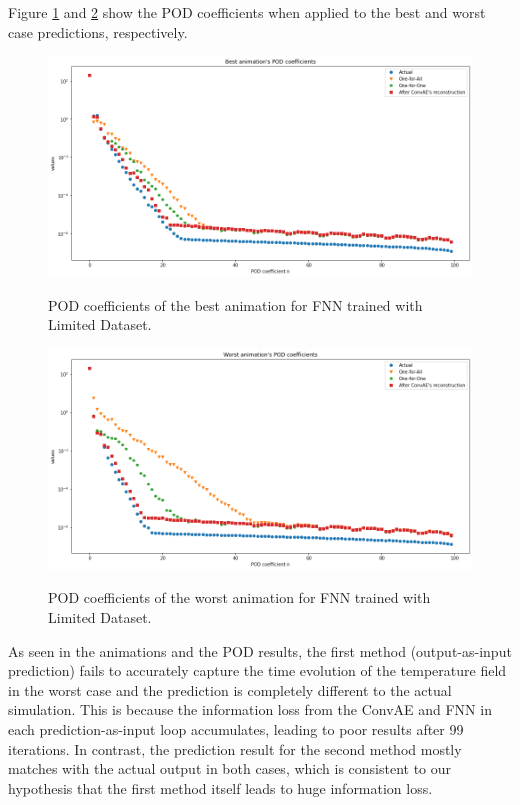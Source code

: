 Figure \ref{figure:FNN_limited_best_POD} and \ref{figure:FNN_limited_worst_POD} show the POD coefficients when applied to the best and worst case predictions, respectively.

\begin{figure}[H]
    \centering
    \caption{POD coefficients of the best animation for FNN trained with Limited Dataset.}
    \includegraphics[scale=0.4]{figures/mantle_convection_images/limited_dataset/FNN_Best_POD.png}
    \label{figure:FNN_limited_best_POD}
\end{figure}

\begin{figure}[H]
    \centering
    \caption{POD coefficients of the worst animation for FNN trained with Limited Dataset.}
    \includegraphics[scale=0.4]{figures/mantle_convection_images/limited_dataset/FNN_Worst_POD.png}
    \label{figure:FNN_limited_worst_POD}
\end{figure}

As seen in the animations and the POD results, the first method (output-as-input prediction) fails to accurately capture the time evolution of the temperature field in the worst case and the prediction is completely different to the actual simulation. This is because the information loss from the ConvAE and FNN in each prediction-as-input loop accumulates, leading to poor results after 99 iterations. In contrast, the prediction result for the second method mostly matches with the actual output in both cases, which is consistent to our hypothesis that the first method itself leads to huge information loss.

